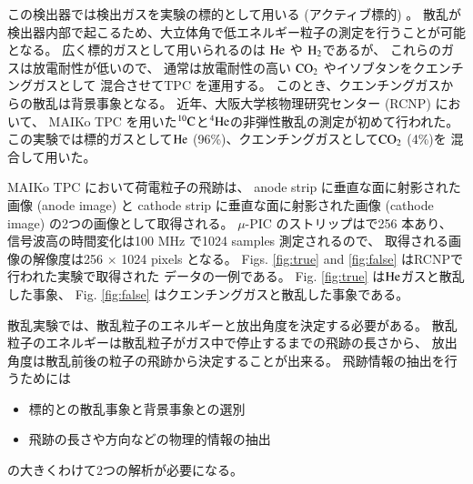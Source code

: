 \documentclass{jps-cp}
\begin{document}
この検出器では検出ガスを実験の標的として用いる (アクティブ標的) 。
散乱が検出器内部で起こるため、大立体角で低エネルギー粒子の測定を行うことが可能となる。
広く標的ガスとして用いられるのは $\rm{He}$ や $\rm{H}_{2}$であるが、
これらのガスは放電耐性が低いので、
通常は放電耐性の高い $\rm{CO}_{2}$ やイソブタンをクエンチングガスとして
混合させてTPC を運用する。
このとき、クエンチングガスからの散乱は背景事象となる。
近年、大阪大学核物理研究センター (RCNP) において、
MAIKo TPC を用いた${}^{10}\rm{C}$と${}^{4}\rm{He}$の非弾性散乱の測定が初めて行われた。
この実験では標的ガスとして$\rm{He}$ (96\%)、クエンチングガスとして$\rm{CO}_{2}$ (4\%)を
混合して用いた。

MAIKo TPC において荷電粒子の飛跡は、
anode strip に垂直な面に射影された画像 (anode image) と
cathode strip に垂直な面に射影された画像 (cathode image) の2つの画像として取得される。
$\mu$-PIC のストリップはで256 本あり、
信号波高の時間変化は100 MHz で1024 samples 測定されるので、
取得される画像の解像度は256 $\times$ 1024 pixels となる。
Figs. \ref{fig:true} and \ref{fig:false} はRCNPで行われた実験で取得された
データの一例である。
Fig. \ref{fig:true} は$\rm{He}$ガスと散乱した事象、
Fig. \ref{fig:false} はクエンチングガスと散乱した事象である。

散乱実験では、散乱粒子のエネルギーと放出角度を決定する必要がある。
散乱粒子のエネルギーは散乱粒子がガス中で停止するまでの飛跡の長さから、
放出角度は散乱前後の粒子の飛跡から決定することが出来る。
飛跡情報の抽出を行うためには
\begin{itemize}
\item 標的との散乱事象と背景事象との選別
\item 飛跡の長さや方向などの物理的情報の抽出
\end{itemize}
の大きくわけて2つの解析が必要になる。
\end{document}
